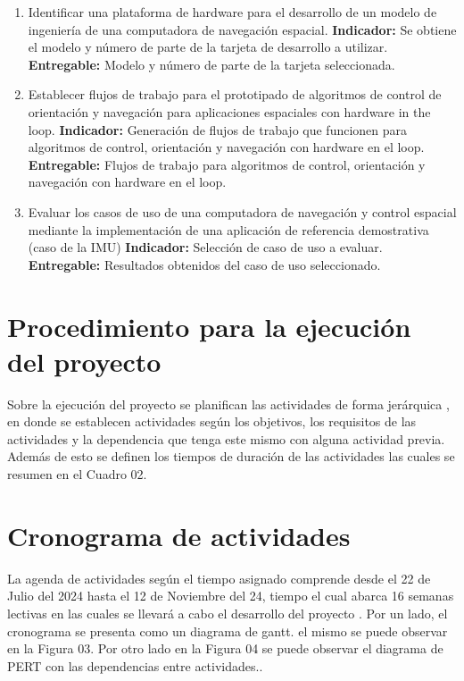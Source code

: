 \documentclass[12pt]{article}
\begin{document}
\begin{enumerate}
  \item Identificar una plataforma de hardware para el desarrollo de un modelo de ingeniería de una computadora de navegación espacial. \newline
        \textbf{Indicador:} Se obtiene el modelo y número de parte de la tarjeta de desarrollo a utilizar.\newline
        \textbf{Entregable:} Modelo y número de parte de la tarjeta seleccionada.
  \item Establecer flujos de trabajo para el prototipado de algoritmos de control de orientación y navegación para aplicaciones espaciales con hardware in the loop. \newline
        \textbf{Indicador:} Generación de flujos de trabajo que funcionen para algoritmos de control, orientación y navegación con hardware en el loop.\newline
        \textbf{Entregable:} Flujos de trabajo para algoritmos de control, orientación y navegación con hardware en el loop.
  \item Evaluar los casos de uso de una computadora de navegación y control espacial mediante la implementación de una aplicación de referencia demostrativa (caso de la IMU) \newline
        \textbf{Indicador:} Selección de caso de uso a evaluar.\newline
        \textbf{Entregable:} Resultados obtenidos del caso de uso seleccionado.
\end{enumerate}

\section{Procedimiento para la ejecución del proyecto}

Sobre la ejecución del proyecto se planifican las actividades de forma jerárquica , en donde se establecen actividades según los objetivos, los requisitos de las actividades y la dependencia que tenga este mismo con alguna actividad previa. Además de esto se definen los tiempos de duración de las actividades las cuales se resumen en el Cuadro 02.


\section{Cronograma de actividades}

La agenda de actividades según el tiempo asignado comprende desde el 22 de Julio del 2024 hasta el 12 de Noviembre del 24, tiempo el cual abarca 16 semanas lectivas en las cuales se llevará a cabo el desarrollo del proyecto . Por un lado, el cronograma se presenta como un diagrama de gantt. el mismo se puede observar en la Figura 03. Por otro lado en la Figura 04 se puede observar el diagrama de PERT con las dependencias entre actividades..
\end{document}
